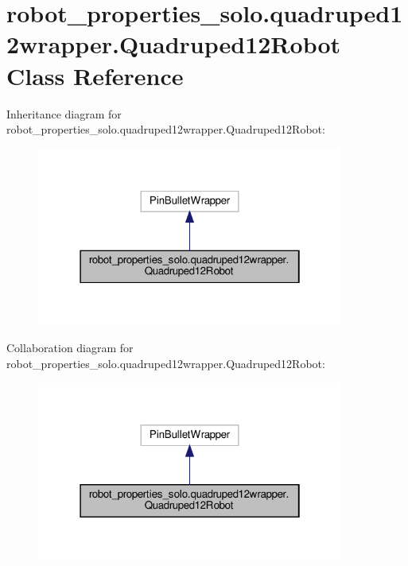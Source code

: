\hypertarget{classrobot__properties__solo_1_1quadruped12wrapper_1_1Quadruped12Robot}{}\section{robot\+\_\+properties\+\_\+solo.\+quadruped12wrapper.\+Quadruped12\+Robot Class Reference}
\label{classrobot__properties__solo_1_1quadruped12wrapper_1_1Quadruped12Robot}


Inheritance diagram for robot\+\_\+properties\+\_\+solo.\+quadruped12wrapper.\+Quadruped12\+Robot\+:
\nopagebreak
\begin{figure}[H]
\begin{center}
\leavevmode
\includegraphics[width=286pt]{classrobot__properties__solo_1_1quadruped12wrapper_1_1Quadruped12Robot__inherit__graph}
\end{center}
\end{figure}


Collaboration diagram for robot\+\_\+properties\+\_\+solo.\+quadruped12wrapper.\+Quadruped12\+Robot\+:
\nopagebreak
\begin{figure}[H]
\begin{center}
\leavevmode
\includegraphics[width=286pt]{classrobot__properties__solo_1_1quadruped12wrapper_1_1Quadruped12Robot__coll__graph}
\end{center}
\end{figure}
